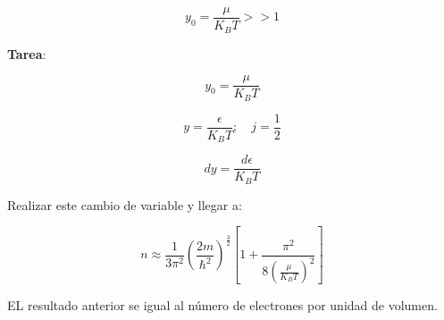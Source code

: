 \documentclass{article}
\begin{document}
\[  y_{0} =  \frac{\mu}{K_{B}T}>> 1   \]



\textbf{Tarea}:



\[  y_{0} = \frac{\mu}{K_{B}T} \]


\[ y= \frac{\epsilon}{K_{B}T}; \quad j = \frac{1}{2}\]




\[ dy = \frac{d\epsilon}{K_{B}T}  \]



Realizar este cambio de variable y llegar a:


\[ n \approx \frac{1}{3\pi^{2}} \left(  \frac{2m}{\hbar^{2}}  \right)^{\frac{3}{2}} \left[  1 + \frac{\pi^{2}}{ 8 \left(\frac{\mu}{K_{B}T}   \right)^{2} } \right]  \]

EL resultado anterior se igual al número de electrones por unidad de volumen.
\end{document}
